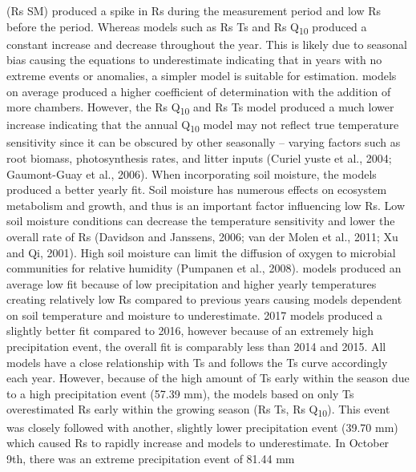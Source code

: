 \documentclass[]{elsarticle} %
\begin{document}
(Rs SM) produced a spike in Rs during the measurement period and low Rs
before the period. Whereas models such as Rs Ts and Rs
Q\textsubscript{10} produced a constant increase and decrease throughout
the year. This is likely due to seasonal bias causing the equations to
underestimate indicating that in years with no extreme events or
anomalies, a simpler model is suitable for estimation. \newline {} models on average produced a higher coefficient of determination
with the addition of more chambers. However, the Rs Q\textsubscript{10}
and Rs Ts model produced a much lower increase indicating that the
annual Q\textsubscript{10} model may not reflect true temperature
sensitivity since it can be obscured by other seasonally -- varying
factors such as root biomass, photosynthesis rates, and litter inputs
(Curiel yuste et al., 2004; Gaumont-Guay et al., 2006). When
incorporating soil moisture, the models produced a better yearly fit.
Soil moisture has numerous effects on ecosystem metabolism and growth,
and thus is an important factor influencing low Rs. Low soil moisture
conditions can decrease the temperature sensitivity and lower the
overall rate of Rs (Davidson and Janssens, 2006; van der Molen et al.,
2011; Xu and Qi, 2001). High soil moisture can limit the diffusion of
oxygen to microbial communities for relative humidity (Pumpanen et al.,
2008). \newline {} models produced an average low fit because
of low precipitation and higher yearly temperatures creating relatively
low Rs compared to previous years causing models dependent on soil
temperature and moisture to underestimate. 2017 models produced a
slightly better fit compared to 2016, however because of an extremely
high precipitation event, the overall fit is comparably less than 2014
and 2015. All models have a close relationship with Ts and follows the
Ts curve accordingly each year. However, because of the high amount of
Ts early within the season due to a high precipitation event (57.39 mm),
the models based on only Ts overestimated Rs early within the growing
season (Rs Ts, Rs Q\textsubscript{10}). \newline \newline This event was
closely followed with another, slightly lower precipitation event (39.70
mm) which caused Rs to rapidly increase and models to underestimate. In
October 9th, there was an extreme precipitation event of 81.44 mm
\end{document}
